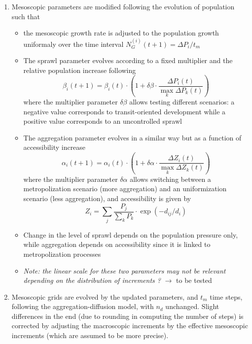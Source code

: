 \documentclass[11pt]{article}
\begin{document}
\begin{enumerate}
	
	\item Mesoscopic parameters are modified following the evolution of population such that 
		\begin{itemize}
			\item the mesoscopic growth rate is adjusted to the population growth uniformaly over the time interval	
			    $N_G^{(i)} (t + 1) = \Delta P_i / t_m$
			\item The sprawl parameter evolves according to a fixed multiplier and the relative population increase following 
			\begin{equation}
				\beta_i (t+1) = \beta_i (t) \cdot \left(1 + \delta\beta \cdot \frac{\Delta P_i (t)}{\max_k  \Delta P_k (t)}\right)
			\end{equation}
			where the multiplier parameter $\delta\beta$ allows testing different scenarios: a negative value corresponds to transit-oriented development while a positive value corresponds to an uncontrolled sprawl
			\item The aggregation parameter evolves in a similar way but as a function of accessibility increase
			\begin{equation}
				\alpha_i (t+1) = \alpha_i (t) \cdot \left(1 + \delta\alpha \cdot \frac{\Delta Z_i (t)}{\max_k  \Delta Z_k (t)}\right)
			\end{equation}
			where the multiplier parameter $\delta\alpha$ allows switching between a metropolization scenario (more aggregation) and an uniformization scenario (less aggregation), and accessibility is given by
			\begin{equation}
				Z_i = \sum_j \frac{P_j}{\sum_k P_k} \cdot \exp( - d_{ij} / d_i)
			\end{equation}
			\item Change in the level of sprawl depends on the population pressure only, while aggregation depends on accessibility since it is linked to metropolization processes
			\item \textit{Note: the linear scale for these two parameters may not be relevant depending on the distribution of increments ?} $\rightarrow$ to be tested
		\end{itemize}
	
	\item Mesoscopic grids are evolved by the updated parameters, and $t_m$ time steps, following the aggregation-diffusion model, with $n_d$ unchanged. Slight differences in the end (due to rounding in computing the number of steps) is corrected by adjusting the macroscopic increments by the effective mesoscopic increments (which are assumed to be more precise).
	

\end{enumerate}
\end{document}
